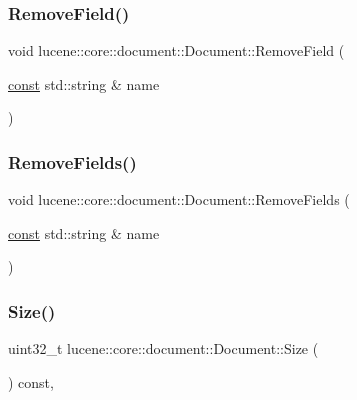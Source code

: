 \subsubsection{\texorpdfstring{Remove\+Field()}{RemoveField()}}
{\footnotesize\ttfamily void lucene\+::core\+::document\+::\+Document\+::\+Remove\+Field (\begin{DoxyParamCaption}\item[{\mbox{\hyperlink{ZlibCrc32_8h_a2c212835823e3c54a8ab6d95c652660e}{const}} std\+::string \&}]{name }\end{DoxyParamCaption})\hspace{0.3cm}{\ttfamily [inline]}}

\mbox{\label{classlucene_1_1core_1_1document_1_1Document_a151221f80667ee317ca8db358e4052e2}} 
\subsubsection{\texorpdfstring{Remove\+Fields()}{RemoveFields()}}
{\footnotesize\ttfamily void lucene\+::core\+::document\+::\+Document\+::\+Remove\+Fields (\begin{DoxyParamCaption}\item[{\mbox{\hyperlink{ZlibCrc32_8h_a2c212835823e3c54a8ab6d95c652660e}{const}} std\+::string \&}]{name }\end{DoxyParamCaption})\hspace{0.3cm}{\ttfamily [inline]}}

\mbox{\label{classlucene_1_1core_1_1document_1_1Document_ad1556e7f0c71a2f347850d6d40392b0c}} 
\subsubsection{\texorpdfstring{Size()}{Size()}}
{\footnotesize\ttfamily uint32\+\_\+t lucene\+::core\+::document\+::\+Document\+::\+Size (\begin{DoxyParamCaption}{ }\end{DoxyParamCaption}) const\hspace{0.3cm}{\ttfamily [inline]}, {\ttfamily [noexcept]}}



